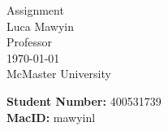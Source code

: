 \documentclass[letterpaper]{article}
\theoremstyle{plain}
\theoremstyle{definition}
\theoremstyle{remark}
\begin{document}

\begin{titlepage}
    \centering
    \vspace*{3cm}
    
    {\Huge Assignment}\\[2cm]
    
    {\large Luca Mawyin}\\[0.5cm]
    
    {\large Professor}\\[0.5cm]

    {\large \today}\\[2cm]

    {\Large McMaster University}

    \vfill
    \begin{flushleft}

        {\large \textbf{Student Number: }400531739}\\[0.5cm]
        {\large \textbf{MacID: }mawyinl}
    \end{flushleft}

\end{titlepage}
\end{document}
